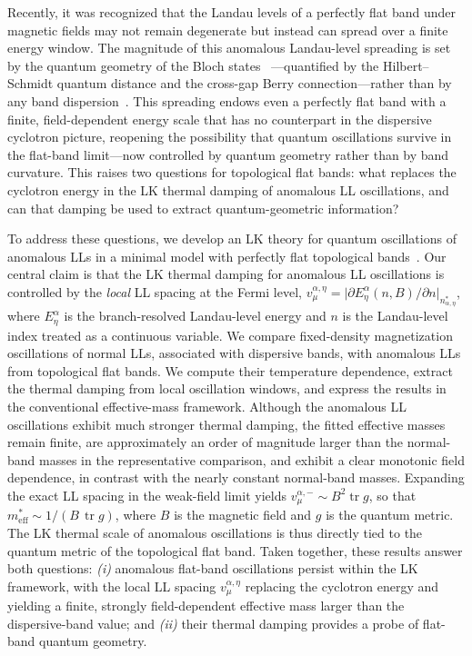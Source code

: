 \documentclass[prl,twocolumn,superscriptaddress,float,aps]{revtex4-2}
\newcommand{\tr}{\operatorname{tr}}
\newcommand{\meff}{m^{*}_{\mathrm{eff}}}
\newcommand{\metric}{g}
\begin{document}
Recently, it was recognized that the Landau levels of a perfectly flat band under magnetic fields may not remain degenerate but instead can spread over a finite energy window. The magnitude of this anomalous Landau-level spreading is set by the quantum geometry of the Bloch states~\cite{kang2025measurements,kim2025direct,yu2025quantum,torma2023essay,liu2025quantum} ---quantified by the Hilbert--Schmidt quantum distance and the cross-gap Berry connection---rather than by any band dispersion~\cite{rhim2020quantum,hwang2021geometric,rhim2020singular,long2026interplay,jung2024quantum,kawakami2025singular,datta2025anomalous,fu2026anomalous}.
This spreading endows even a perfectly flat band with a finite, field-dependent energy scale that has no counterpart in the dispersive cyclotron picture, reopening the possibility that quantum oscillations survive in the flat-band limit---now controlled by quantum geometry rather than by band curvature.
This raises two questions for topological flat bands: what replaces the
cyclotron energy in the LK thermal damping of anomalous LL oscillations, and
can that damping be used to extract quantum-geometric information?

To address these questions, we develop an LK theory for quantum oscillations of anomalous LLs in a minimal model with perfectly flat topological bands~\cite{liu2025ideal}. Our central claim is that the LK thermal damping for anomalous LL oscillations is controlled by the \emph{local} LL spacing at the Fermi level, $v_\mu^{\alpha,\eta}=\bigl|\partial E^\alpha_\eta(n,B)/\partial n\bigr|_{n^*_{\alpha,\eta}}$, where $E^\alpha_\eta$ is the branch-resolved Landau-level energy and $n$ is the Landau-level index treated as a continuous variable. We compare fixed-density magnetization oscillations of normal LLs, associated with dispersive bands, with anomalous LLs from topological flat bands. We compute their temperature dependence, extract the thermal damping from local oscillation windows, and express the results in the conventional effective-mass framework. Although the anomalous LL oscillations exhibit much stronger thermal damping, the fitted effective masses remain finite, are approximately an order of magnitude larger than the normal-band masses in the representative comparison, and exhibit a clear monotonic field dependence, in contrast with the nearly constant normal-band masses. Expanding the exact LL spacing in the weak-field limit yields $v_\mu^{\alpha,-} \sim B^2 \tr\metric$, so that $\meff \sim 1/(B\,\tr\metric)$, where $B$ is the magnetic field and $\metric$ is the quantum metric. The LK thermal scale of anomalous oscillations is thus directly tied to the quantum metric of the topological flat band. Taken together, these results answer both questions: \emph{(i)} anomalous flat-band oscillations persist within the LK framework, with the local LL spacing $v_\mu^{\alpha,\eta}$ replacing the cyclotron energy and yielding a finite, strongly field-dependent effective mass larger than the dispersive-band value; and \emph{(ii)} their thermal damping provides a probe of flat-band quantum geometry.
\end{document}

